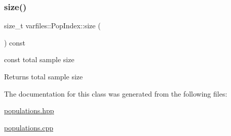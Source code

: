\subsubsection{\texorpdfstring{size()}{size()}\hspace{0.1cm}{\footnotesize\ttfamily [2/2]}}
{\footnotesize\ttfamily size\+\_\+t varfiles\+::\+Pop\+Index\+::size (\begin{DoxyParamCaption}{ }\end{DoxyParamCaption}) const\hspace{0.3cm}{\ttfamily [inline]}}



{\ttfamily const} total sample size 

\begin{DoxyReturn}{Returns}
total sample size 
\end{DoxyReturn}


The documentation for this class was generated from the following files\+:\begin{DoxyCompactItemize}
\item 
\hyperlink{populations_8hpp}{populations.\+hpp}\item 
\hyperlink{populations_8cpp}{populations.\+cpp}\end{DoxyCompactItemize}
